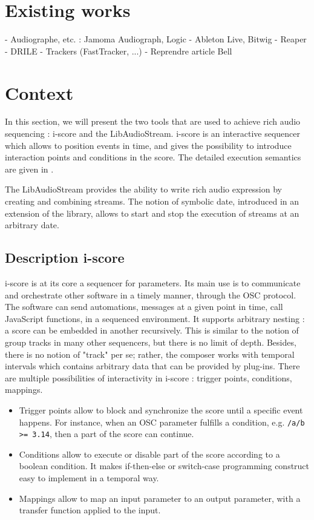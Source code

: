 \documentclass{article}
\begin{document}


\section{Existing works}
- Audiographe, etc. : Jamoma Audiograph, Logic
- Ableton Live, Bitwig
- Reaper
- DRILE
- Trackers (FastTracker, ...)
- Reprendre article Bell

\section{Context}
In this section, we will present the two tools that are used to achieve 
rich audio sequencing : i-score and the LibAudioStream.
i-score is an interactive sequencer which allows to position events 
in time, and gives the possibility to introduce interaction points and 
conditions in the score.
The detailed execution semantics are given in \cite{celerier2015ossia}.

The LibAudioStream\cite{letzlibaudiostream} provides the ability to write rich audio expression
by creating and combining streams. The notion of symbolic date, introduced in an extension of the library,
allows to start and stop the execution of streams at an arbitrary date.

\subsection{Description i-score}
i-score is at its core a sequencer for parameters. 
Its main use is to communicate and orchestrate other software in a timely manner, 
through the OSC protocol.
The software can send automations, messages at a given point in time, call JavaScript 
functions, in a sequenced environment.
It supports arbitrary nesting : a score can be embedded in another recursively.
This is similar to the notion of group tracks in many other sequencers, but 
there is no limit of depth. 
Besides, there is no notion of "track" per se; rather, the composer works with 
temporal intervals which contains arbitrary data that can be provided by plug-ins.
There are multiple possibilities of interactivity in i-score : trigger points, conditions, 
mappings.
\begin{itemize}
    \item Trigger points allow to block and synchronize the score until a specific event happens.
    For instance, when an OSC parameter fulfills a condition, e.g. \lstinline|/a/b >= 3.14|, then 
    a part of the score can continue.
    \item Conditions allow to execute or disable part of the score according to a boolean condition.
    It makes if-then-else or switch-case programming construct easy to implement in a temporal way.
    \item Mappings allow to map an input parameter to an output parameter, with a transfer function applied to the input.
\end{itemize}
\end{document}
